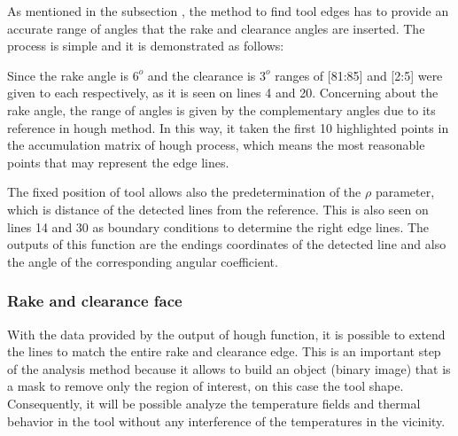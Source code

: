 	As mentioned in the subsection , the method to find tool edges has to provide an accurate range of angles that the rake and clearance angles are inserted. The process is simple and it is demonstrated as follows:

	

	Since the rake angle is $6^{o}$ and the clearance is $3^{o}$ ranges of [81:85] and [2:5] were given to each respectively, as it is seen on lines 4 and 20. Concerning about the rake angle, the range of angles is given by the complementary angles due to its reference in hough method. In this way, it taken the first 10 highlighted points in the accumulation matrix of hough process, which means the most reasonable points that may represent the edge lines.

	The fixed position of tool allows also the predetermination of the $\rho$ parameter, which is distance of the detected lines from the reference. This is also seen on lines 14 and 30 as boundary conditions to determine the right edge lines. The outputs of this function are the endings coordinates of the detected line and also the angle of the corresponding angular coefficient. 


		\subsubsection{Rake and clearance face}

		With the data provided by the output of hough function, it is possible to extend the lines to match the entire rake and clearance edge. This is an important step of the analysis method because it allows to build an object (binary image) that is a mask to remove only the region of interest, on this case the tool shape. Consequently, it will be possible analyze the temperature fields and thermal behavior in the tool without any interference of the temperatures in the vicinity.

